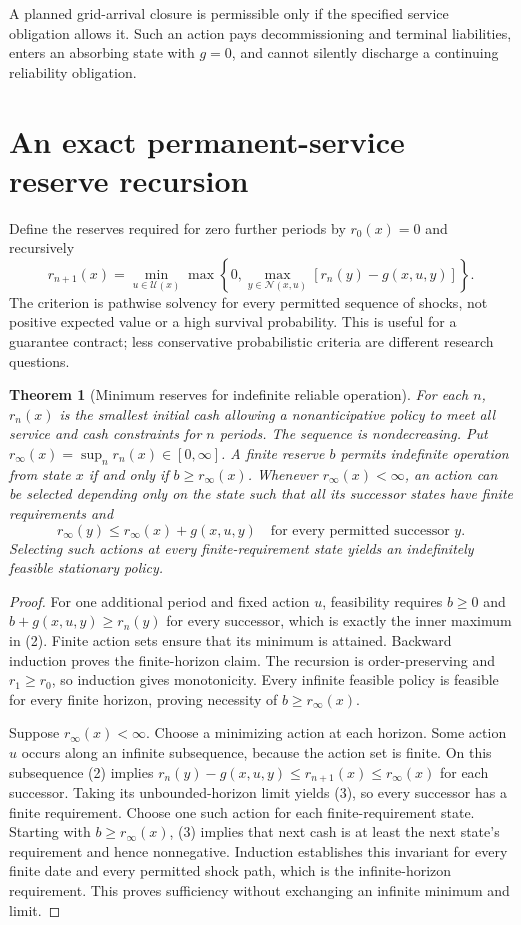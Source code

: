 \documentclass[11pt]{article}
\newtheorem{theorem}{Theorem}
\begin{document}
A planned grid-arrival closure is permissible only if the specified
service obligation allows it. Such an action pays decommissioning and
terminal liabilities, enters an absorbing state with $g=0$, and cannot
silently discharge a continuing reliability obligation.

\section{An exact permanent-service reserve recursion}
Define the reserves required for zero further periods by $r_0(x)=0$ and
recursively
\[
 r_{n+1}(x)=\min_{u\in\mathcal U(x)}
       \max\left\{0,\max_{y\in\mathcal N(x,u)}
                         [r_n(y)-g(x,u,y)]\right\}.          \tag{2}
\]
The criterion is pathwise solvency for every permitted sequence of shocks,
not positive expected value or a high survival probability. This is useful
for a guarantee contract; less conservative probabilistic criteria are
different research questions.

\begin{theorem}[Minimum reserves for indefinite reliable operation]
For each $n$, $r_n(x)$ is the smallest initial cash allowing a
nonanticipative policy to meet all service and cash constraints for $n$
periods. The sequence is nondecreasing. Put
$r_\infty(x)=\sup_n r_n(x)\in[0,\infty]$.
A finite reserve $b$ permits indefinite operation from state $x$ if and
only if $b\geq r_\infty(x)$. Whenever $r_\infty(x)<\infty$, an action
can be selected depending only on the state such that all its successor
states have finite requirements and
\[
 r_\infty(y)\leq r_\infty(x)+g(x,u,y)
 \quad\text{for every permitted successor }y.              \tag{3}
\]
Selecting such actions at every finite-requirement state yields an
indefinitely feasible stationary policy.
\end{theorem}
\begin{proof}
For one additional period and fixed action $u$, feasibility requires
$b\geq0$ and $b+g(x,u,y)\geq r_n(y)$ for every successor, which is
exactly the inner maximum in (2). Finite action sets ensure that its
minimum is attained. Backward induction proves the finite-horizon
claim. The recursion is order-preserving and $r_1\geq r_0$, so induction
gives monotonicity. Every infinite feasible policy is feasible for every
finite horizon, proving necessity of $b\geq r_\infty(x)$.

Suppose $r_\infty(x)<\infty$. Choose a minimizing action at each horizon.
Some action $u$ occurs along an infinite subsequence, because the action
set is finite. On this subsequence (2) implies
$r_n(y)-g(x,u,y)\leq r_{n+1}(x)\leq r_\infty(x)$ for each successor.
Taking its unbounded-horizon limit yields (3), so every successor has a
finite requirement. Choose one such action for each finite-requirement
state. Starting with $b\geq r_\infty(x)$, (3) implies that next cash is
at least the next state's requirement and hence nonnegative. Induction
establishes this invariant for every finite date and every permitted shock
path, which is the infinite-horizon requirement. This proves sufficiency
without exchanging an infinite minimum and limit.
\end{proof}
\end{document}
